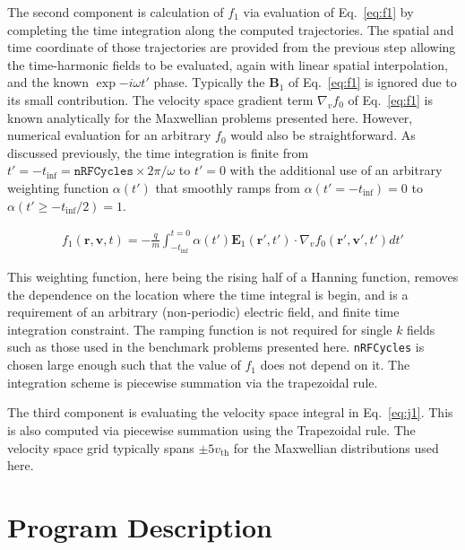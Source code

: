 \documentclass[final,5p,times,twocolumn]{elsarticle}
\newcounter{bla}
\renewcommand{\vec}[1]{\mathbf{#1}}
\begin{document}
The second component is calculation of $f_{\mathrm{1}}$ via evaluation of Eq.~\ref{eq:f1} by completing the time integration along the computed trajectories. The spatial and time coordinate of those trajectories are provided from the previous step allowing the time-harmonic fields to be evaluated, again with linear spatial interpolation, and the known $\exp{-i\omega t'}$ phase. Typically the $\vec{B}_{\mathrm{1}}$ of Eq.~\ref{eq:f1} is ignored due to its small contribution. The velocity space gradient term $\nabla_v f_{\mathrm{0}}$ of Eq.~\ref{eq:f1} is known analytically for the Maxwellian problems presented here. However, numerical evaluation for an arbitrary $f_\mathrm{0}$ would also be straightforward. As discussed previously, the time integration is finite from $t'=-t_{\mathrm{inf}}=\texttt{nRFCycles}\times{2\pi}/\omega$ to $t'=0$ with the additional use of an arbitrary weighting function $\alpha\left(t'\right)$ that smoothly ramps from $\alpha\left(t'=-t_{\mathrm{inf}}\right)=0$ to $\alpha\left(t'\ge-t_{\mathrm{inf}}/2\right)=1$. 
%
\begin{linenomath}
\begin{equation}
\begin{split}
\label{eq:f1_2}
f_{\mathrm{1}}\left(\vec{r},\vec{v},t\right)=-\frac{q}{m}\int_{-t_\mathrm{inf}}^{t=0}
\alpha\left(t'\right)\vec{E}_{\mathrm{1}}\left(\vec{r}',t'\right) 
\hspace{0cm} \cdot\nabla_v f_{\mathrm{0}} \left(\vec{r}',\vec{v}',t'\right)dt'
\end{split}
\end{equation}
\end{linenomath}
%
This weighting function, here being the rising half of a Hanning function, removes the dependence on the location where the time integral is begin, and is a requirement of an arbitrary (non-periodic) electric field, and finite time integration constraint. The ramping function is not required for single $k$ fields such as those used in the benchmark problems presented here. \texttt{nRFCycles} is chosen large enough such that the value of $f_{\mathrm{1}}$ does not depend on it. The integration scheme is piecewise summation via the trapezoidal rule. 

The third component is evaluating the velocity space integral in Eq.~\ref{eq:j1}. This is also computed via piecewise summation using the Trapezoidal rule. The velocity space grid typically spans $\pm 5v_{\mathrm{th}}$ for the Maxwellian distributions used here.
%
\section{Program Description}
\label{section:program}
%
\end{document}
